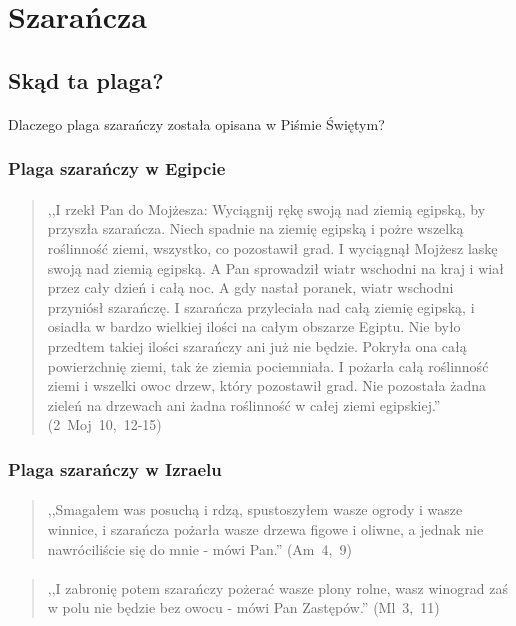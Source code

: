 \documentclass[10pt,a4paper,oneside]{article}
\begin{document}
\section{Szarańcza}
\subsection{Skąd ta plaga?}
\paragraph{}
Dlaczego plaga szarańczy została opisana w Piśmie Świętym?
\subsubsection{Plaga szarańczy w Egipcie}
\paragraph{}
\begin{quote}
,,I rzekł Pan do Mojżesza: Wyciągnij rękę swoją nad ziemią egipską, by przyszła szarańcza. Niech spadnie na ziemię egipską i pożre wszelką roślinność ziemi, wszystko, co pozostawił grad. I wyciągnął Mojżesz laskę swoją nad ziemią egipską. A Pan sprowadził wiatr wschodni na kraj i wiał przez cały dzień i całą noc. A gdy nastał poranek, wiatr wschodni przyniósł szarańczę. I szarańcza przyleciała nad całą ziemię egipską, i osiadła w bardzo wielkiej ilości na całym obszarze Egiptu. Nie było przedtem takiej ilości szarańczy ani już nie będzie. Pokryła ona całą powierzchnię ziemi, tak że ziemia pociemniała. I pożarła całą roślinność ziemi i wszelki owoc drzew, który pozostawił grad. Nie pozostała żadna zieleń na drzewach ani żadna roślinność w całej ziemi egipskiej.'' \mbox{(2 Moj 10, 12-15)}
\end{quote}
\subsubsection{Plaga szarańczy w Izraelu}
\paragraph{}
\begin{quote}
,,Smagałem was posuchą i rdzą, spustoszyłem wasze ogrody i wasze winnice, i szarańcza pożarła wasze drzewa figowe i oliwne, a jednak nie nawróciliście się do mnie - mówi Pan.'' \mbox{(Am 4, 9)}
\end{quote}
\paragraph{}
\begin{quote}
,,I zabronię potem szarańczy pożerać wasze plony rolne, wasz winograd zaś w polu nie będzie bez owocu - mówi Pan Zastępów.'' \mbox{(Ml 3, 11)}
\end{quote}
\end{document}
